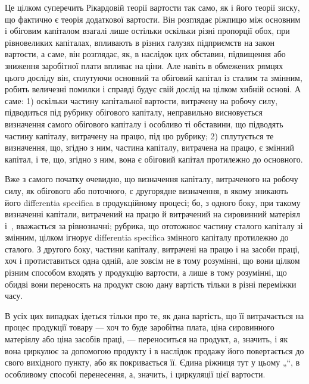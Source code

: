 Це цілком суперечить Рікардовій теорії вартости так само, як і його
теорії зиску, що фактично є теорія додаткової вартости. Він розглядає
ріжпицю між основним і обіговим капіталом взагалі лише остільки
оскільки різні пропорції обох, при рівновеликих капіталах, впливають
в різних галузях підприємств на закон вартости, а саме, він розглядає,
як, в наслідок цих обставин, підвищення або зниження заробітної плати
впливає на ціни. Але навіть в обмежених рямцях цього досліду він, сплутуючи
основний та обіговий капітал із сталим та змінним, робить величезні
помилки і справді будує свій дослід на цілком хибній основі. А
саме: 1) оскільки частину капітальної вартости, витрачену на робочу
силу, підводиться під рубрику обігового капіталу, неправильно висновується
визначення самого обігового капіталу і особливо ті обставини,
що підводять частину капіталу, витрачену на працю, під цю рубрику; 2)
сплутується те визначення, що, згідно з ним, частина капіталу, витрачена
на працю, є змінний капітал, і те, що, згідно з ним, вона є обіговий
капітал протилежно до основного.

Вже з самого початку очевидно, що визначення капіталу, витраченого
на робочу силу, як обігового або поточного, є другорядне визначення,
в якому зникають його differentia specifica в продукційному процесі;
бо, з одного боку, при такому визначенні капітали, витрачений на працю
й витрачений на сировинний матеріял і~, вважається за рівнозначні;
рубрика, що ототожнює частину сталого капіталу зі змінним, цілком ігнорує
differentia specifica змінного капіталу протилежно до сталого. З другого
боку, частини капіталу, витрачені на працю і на засоби праці, хоч
і протиставиться одна одній, але зовсім не в тому розумінні, що вони
цілком різним способом входять у продукцію вартости, а лише в тому
розумінні, що обидві вони переносять на продукт свою дану вартість
тільки в різні переміжки часу.

В усіх цих випадках ідеться тільки про те, як дана вартість, що її
витрачається на процес продукції товару — хоч то буде заробітна плата,
ціна сировинного матеріялу або ціна засобів праці, — переноситься на
продукт, а, значить, і як вона циркулює за допомогою продукту і в наслідок
продажу його повертається до свого вихідного пункту, або як
покривається її. Єдина ріжниця тут у цьому „“, в особливому способі
перенесення, а, значить, і циркуляції цієї вартости.


